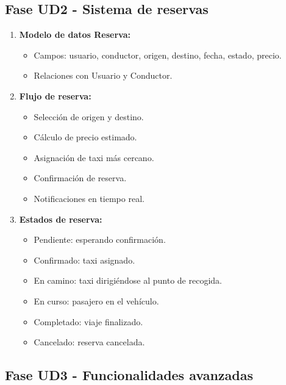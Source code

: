 \documentclass[12pt,a4paper]{article}
\begin{document}
\subsection{Fase UD2 - Sistema de reservas}

\begin{enumerate}
    \item \textbf{Modelo de datos Reserva:}
    \begin{itemize}
        \item Campos: usuario, conductor, origen, destino, fecha, estado, precio.
        \item Relaciones con Usuario y Conductor.
    \end{itemize}
    
    \item \textbf{Flujo de reserva:}
    \begin{itemize}
        \item Selección de origen y destino.
        \item Cálculo de precio estimado.
        \item Asignación de taxi más cercano.
        \item Confirmación de reserva.
        \item Notificaciones en tiempo real.
    \end{itemize}
    
    \item \textbf{Estados de reserva:}
    \begin{itemize}
        \item Pendiente: esperando confirmación.
        \item Confirmado: taxi asignado.
        \item En camino: taxi dirigiéndose al punto de recogida.
        \item En curso: pasajero en el vehículo.
        \item Completado: viaje finalizado.
        \item Cancelado: reserva cancelada.
    \end{itemize}
\end{enumerate}

\subsection{Fase UD3 - Funcionalidades avanzadas}
\end{document}
